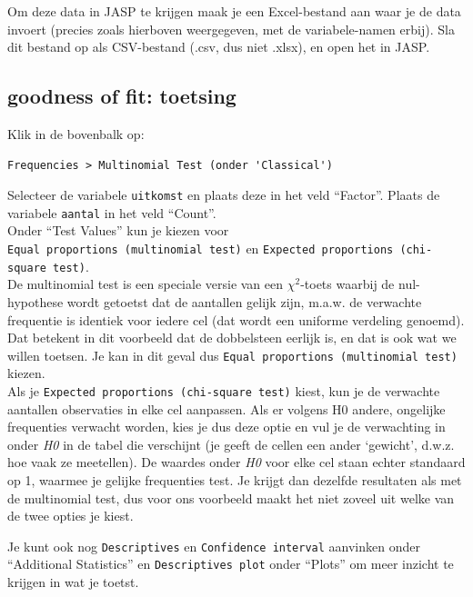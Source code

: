 \documentclass[
]{book}
\begin{document}
Om deze data in JASP te krijgen maak je een Excel-bestand aan waar je de data invoert (precies zoals hierboven weergegeven, met de variabele-namen erbij).
Sla dit bestand op als CSV-bestand (.csv, dus niet .xlsx), en open het in JASP.

\hypertarget{goodness-of-fit-toetsing-1}{%
\subsection{goodness of fit: toetsing}\label{goodness-of-fit-toetsing-1}}

Klik in de bovenbalk op:

\begin{verbatim}
Frequencies > Multinomial Test (onder 'Classical')
\end{verbatim}

Selecteer de variabele \texttt{uitkomst} en plaats deze in het veld ``Factor''. Plaats de variabele \texttt{aantal} in het veld ``Count''.\\

Onder ``Test Values'' kun je kiezen voor \texttt{Equal\ proportions\ (multinomial\ test)} en \texttt{Expected\ proportions\ (chi-square\ test)}.\\
De multinomial test is een speciale versie van een \(\chi^2\)-toets waarbij de nul-hypothese wordt getoetst dat de aantallen gelijk zijn, m.a.w. de verwachte frequentie is identiek voor iedere cel (dat wordt een uniforme verdeling genoemd). Dat betekent in dit voorbeeld dat de dobbelsteen eerlijk is, en dat is ook wat we willen toetsen. Je kan in dit geval dus \texttt{Equal\ proportions\ (multinomial\ test)} kiezen.\\
Als je \texttt{Expected\ proportions\ (chi-square\ test)} kiest, kun je de verwachte aantallen observaties in elke cel aanpassen. Als er volgens H0 andere, ongelijke frequenties verwacht worden, kies je dus deze optie en vul je de verwachting in onder \emph{H0} in de tabel die verschijnt (je geeft de cellen een ander `gewicht', d.w.z. hoe vaak ze meetellen). De waardes onder \emph{H0} voor elke cel staan echter standaard op 1, waarmee je gelijke frequenties test. Je krijgt dan dezelfde resultaten als met de multinomial test, dus voor ons voorbeeld maakt het niet zoveel uit welke van de twee opties je kiest.

Je kunt ook nog \texttt{Descriptives} en \texttt{Confidence\ interval} aanvinken onder ``Additional Statistics'' en \texttt{Descriptives\ plot} onder ``Plots'' om meer inzicht te krijgen in wat je toetst.
\end{document}
